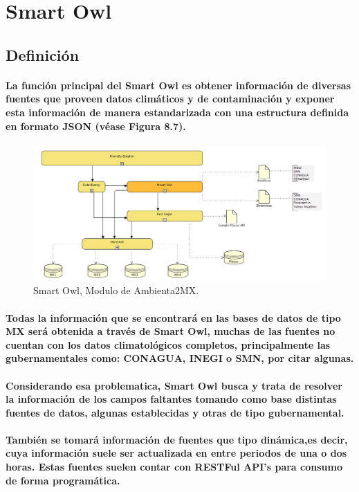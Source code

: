 \section{Smart Owl}
  \subsection{Definición}
  \paragraph{La función principal del Smart Owl es obtener información de diversas fuentes que proveen datos climáticos y de contaminación y exponer esta información de manera estandarizada con una estructura definida en formato JSON (véase Figura 8.7).}
  \begin{figure}[h!]
    \centering
      \includegraphics[width=\textwidth]{./images/DiagramaAmbienta2MX_SmartOwl.png}
    \caption{Smart Owl, Modulo de Ambienta2MX.} 
  \end{figure}
  \paragraph{Todas la información que se encontrará en las bases de datos de tipo MX será obtenida a través de Smart Owl, muchas de las fuentes no cuentan con los datos climatológicos completos, principalmente las gubernamentales como: CONAGUA, INEGI o SMN, por citar algunas.}
  \paragraph{Considerando esa problematica, Smart Owl busca y trata de resolver la información de los campos faltantes tomando como base distintas fuentes de datos, algunas establecidas y otras de tipo gubernamental.}
  \paragraph{También se tomará información de fuentes que tipo dinámica,es decir, cuya información suele ser actualizada en entre periodos de una o dos horas. Estas fuentes suelen contar con RESTFul API's para consumo de forma programática.}
